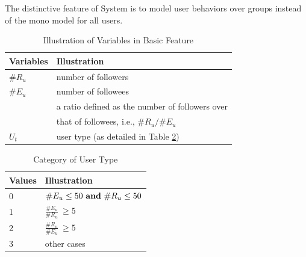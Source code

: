 The distinctive feature of System  \sys{} is to model user \retg{} behaviors over groups instead of the mono model for all users.

\begin{table}[tb!]
\centering
\begin{small}
\caption{Illustration of Variables in Basic Feature}
\vspace{0.3cm}
\label{tbl:fe-info}
\begin{tabular}{ll}
\toprule
\multicolumn{1}{l}{\textbf{Variables}} & \multicolumn{1}{l}{\textbf{Illustration}}	\\	\midrule \midrule
\#$R_u$				& number of followers				\\	\midrule
\#$E_u$				& number of followees				\\	\midrule
                    & a ratio defined as the number of followers over \\
\raisebox{1.5ex}{$R_{ee}$}  & that of followees, i.e., ${\#R_u}/{\#E_u}$ \\  \midrule
$U_t$					& user type (as detailed in Table \ref{tbl:ucate})			\\ \bottomrule
\end{tabular}
\end{small}
\vspace{-3ex}
\end{table}
\begin{table}[tb!]
\centering
\begin{small}
\caption{Category of User Type}
\vspace{0.3cm}
\label{tbl:ucate}
\begin{tabular}{ll}
\toprule
\multicolumn{1}{l}{\textbf{Values}} & \multicolumn{1}{l}{\textbf{Illustration}}	\\	\midrule \midrule
0                       & $\#E_u \le 50 \ {\bf and} \ \#R_u \le 50$				\\	\midrule
\multirow{2}{*}{1}      & \multirow{2}{*}{$\frac{\#E_u}{\#R_u} \ \ge 5$}	\\
 						&                       									\\	\midrule
\multirow{2}{*}{2}		& \multirow{2}{*}{$\frac{\#R_u}{\#E_u} \ \ge 5$}  \\
						&															\\	\midrule
3                   	& other cases 												\\ \bottomrule
\end{tabular}
\end{small}
\end{table}


